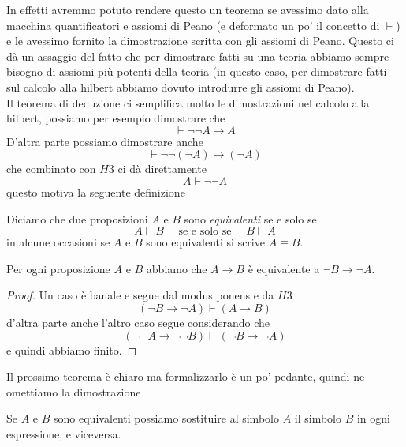 \documentclass[11pt]{scrartcl}
\begin{document}
	In effetti avremmo potuto rendere questo un teorema se avessimo dato alla macchina quantificatori e assiomi di Peano (e deformato un po' il concetto di $\vdash$) e le avessimo fornito la dimostrazione scritta con gli assiomi di Peano. Questo ci dà un assaggio del fatto che per dimostrare fatti su una teoria abbiamo sempre bisogno di assiomi più potenti della teoria (in questo caso, per dimostrare fatti sul calcolo alla hilbert abbiamo dovuto introdurre gli assiomi di Peano). \\
	Il teorema di deduzione ci semplifica molto le dimostrazioni nel calcolo alla hilbert, possiamo per esempio dimostrare che
	$$\vdash \lnot\lnot A \to A$$
	D'altra parte possiamo dimostrare anche 
	$$\vdash\lnot\lnot(\lnot A)\to (\lnot A)$$
	che combinato con $H3$ ci dà direttamente 
	$$A \vdash \lnot\lnot A$$
	questo motiva la seguente definizione
	\begin{definition}
		Diciamo che due proposizioni $A$ e $B$ sono \textit{equivalenti} se e solo se 
		$$A\vdash B \quad \text{ se e solo se } \quad B\vdash A$$
		in alcune occasioni se $A$ e $B$ sono equivalenti si scrive $A\equiv B$.
	\end{definition}
	\begin{metateorema}
		Per ogni proposizione $A$ e $B$ abbiamo che $A\to B$ è equivalente a $\lnot B \to \lnot A$.
	\end{metateorema}
	\begin{proof}
		Un caso è banale e segue dal modus ponens e da $H3$
		$$(\lnot B \to \lnot A) \vdash (A \to B)$$
		d'altra parte anche l'altro caso segue considerando che 
		$$(\lnot \lnot A \to \lnot \lnot B) \vdash (\lnot B \to \lnot A)$$
		e quindi abbiamo finito.
	\end{proof}
	Il prossimo teorema è chiaro ma formalizzarlo è un po' pedante, quindi ne omettiamo la dimostrazione
	\begin{metateorema}[Sostituzione]
		Se $A$ e $B$ sono equivalenti possiamo sostituire al simbolo $A$ il simbolo $B$ in ogni espressione, e viceversa.
	\end{metateorema}
	
\end{document}
